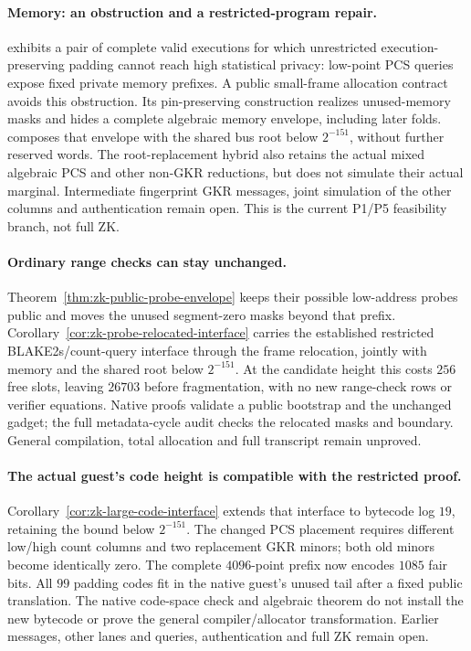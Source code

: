 \paragraph{Memory: an obstruction and a restricted-program repair.}  exhibits a pair of complete valid executions for which unrestricted execution-preserving padding cannot reach high statistical privacy: low-point PCS queries expose fixed private memory prefixes. A public small-frame allocation contract avoids this obstruction. Its pin-preserving construction realizes unused-memory masks and hides a complete algebraic memory envelope, including later folds.  composes that envelope with the shared bus root below $2^{-151}$, without further reserved words. The root-replacement hybrid also retains the actual mixed algebraic PCS and other non-GKR reductions, but does not simulate their actual marginal. Intermediate fingerprint GKR messages, joint simulation of the other columns and authentication remain open. This is the current P1/P5 feasibility branch, not full ZK.

\paragraph{Ordinary range checks can stay unchanged.} Theorem~\ref{thm:zk-public-probe-envelope} keeps their possible low-address probes public and moves the unused segment-zero masks beyond that prefix. Corollary~\ref{cor:zk-probe-relocated-interface} carries the established restricted BLAKE2s/count-query interface through the frame relocation, jointly with memory and the shared root below $2^{-151}$. At the candidate height this costs $256$ free slots, leaving $26703$ before fragmentation, with no new range-check rows or verifier equations. Native proofs validate a public bootstrap and the unchanged gadget; the full metadata-cycle audit checks the relocated masks and boundary. General compilation, total allocation and full transcript remain unproved.

\paragraph{The actual guest's code height is compatible with the restricted proof.} Corollary~\ref{cor:zk-large-code-interface} extends that interface to bytecode log $19$, retaining the bound below $2^{-151}$. The changed PCS placement requires different low/high count columns and two replacement GKR minors; both old minors become identically zero. The complete $4096$-point prefix now encodes $1085$ fair bits. All $99$ padding codes fit in the native guest's unused tail after a fixed public translation. The native code-space check and algebraic theorem do not install the new bytecode or prove the general compiler/allocator transformation. Earlier messages, other lanes and queries, authentication and full ZK remain open.

